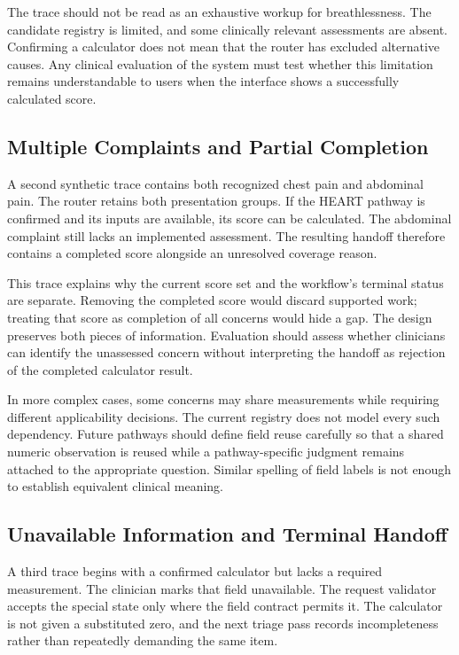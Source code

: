 \documentclass[conference]{IEEEtran}
\begin{document}
The trace should not be read as an exhaustive workup for breathlessness. The candidate registry is limited, and some clinically relevant assessments are absent. Confirming a calculator does not mean that the router has excluded alternative causes. Any clinical evaluation of the system must test whether this limitation remains understandable to users when the interface shows a successfully calculated score.

\subsection{Multiple Complaints and Partial Completion}
A second synthetic trace contains both recognized chest pain and abdominal pain. The router retains both presentation groups. If the HEART pathway is confirmed and its inputs are available, its score can be calculated. The abdominal complaint still lacks an implemented assessment. The resulting handoff therefore contains a completed score alongside an unresolved coverage reason.

This trace explains why the current score set and the workflow's terminal status are separate. Removing the completed score would discard supported work; treating that score as completion of all concerns would hide a gap. The design preserves both pieces of information. Evaluation should assess whether clinicians can identify the unassessed concern without interpreting the handoff as rejection of the completed calculator result.

In more complex cases, some concerns may share measurements while requiring different applicability decisions. The current registry does not model every such dependency. Future pathways should define field reuse carefully so that a shared numeric observation is reused while a pathway-specific judgment remains attached to the appropriate question. Similar spelling of field labels is not enough to establish equivalent clinical meaning.

\subsection{Unavailable Information and Terminal Handoff}
A third trace begins with a confirmed calculator but lacks a required measurement. The clinician marks that field unavailable. The request validator accepts the special state only where the field contract permits it. The calculator is not given a substituted zero, and the next triage pass records incompleteness rather than repeatedly demanding the same item.
\end{document}
